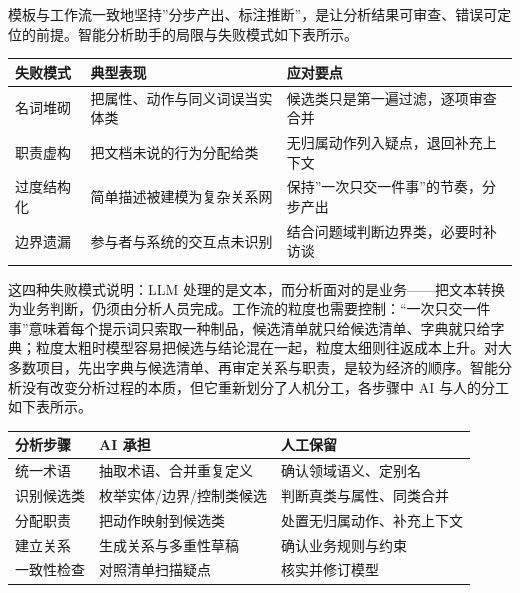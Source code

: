 \documentclass[
]{ctexbook}
\newcounter{none}
\begin{document}
模板与工作流一致地坚持''分步产出、标注推断''，是让分析结果可审查、错误可定位的前提。智能分析助手的局限与失败模式如下表所示。

{\def\LTcaptype{none} %
\begin{longtable}[]{@{}
  >{\raggedright\arraybackslash}p{}
  >{\raggedright\arraybackslash}p{}
  >{\raggedright\arraybackslash}p{}@{}}
\toprule\noalign{}
\begin{minipage}[b]{\linewidth}\raggedright
失败模式
\end{minipage} & \begin{minipage}[b]{\linewidth}\raggedright
典型表现
\end{minipage} & \begin{minipage}[b]{\linewidth}\raggedright
应对要点
\end{minipage} \\
\midrule\noalign{}
\endhead
\bottomrule\noalign{}
\endlastfoot
名词堆砌 & 把属性、动作与同义词误当实体类 &
候选类只是第一遍过滤，逐项审查合并 \\
职责虚构 & 把文档未说的行为分配给类 &
无归属动作列入疑点，退回补充上下文 \\
过度结构化 & 简单描述被建模为复杂关系网 &
保持''一次只交一件事''的节奏，分步产出 \\
边界遗漏 & 参与者与系统的交互点未识别 &
结合问题域判断边界类，必要时补访谈 \\
\end{longtable}
}

这四种失败模式说明：LLM
处理的是文本，而分析面对的是业务------把文本转换为业务判断，仍须由分析人员完成。工作流的粒度也需要控制：``一次只交一件事''意味着每个提示词只索取一种制品，候选清单就只给候选清单、字典就只给字典；粒度太粗时模型容易把候选与结论混在一起，粒度太细则往返成本上升。对大多数项目，先出字典与候选清单、再审定关系与职责，是较为经济的顺序。智能分析没有改变分析过程的本质，但它重新划分了人机分工，各步骤中
AI 与人的分工如下表所示。

{\def\LTcaptype{none} %
\begin{longtable}[]{@{}lll@{}}
\toprule\noalign{}
分析步骤 & AI 承担 & 人工保留 \\
\midrule\noalign{}
\endhead
\bottomrule\noalign{}
\endlastfoot
统一术语 & 抽取术语、合并重复定义 & 确认领域语义、定别名 \\
识别候选类 & 枚举实体/边界/控制类候选 & 判断真类与属性、同类合并 \\
分配职责 & 把动作映射到候选类 & 处置无归属动作、补充上下文 \\
建立关系 & 生成关系与多重性草稿 & 确认业务规则与约束 \\
一致性检查 & 对照清单扫描疑点 & 核实并修订模型 \\
\end{longtable}
}
\end{document}
